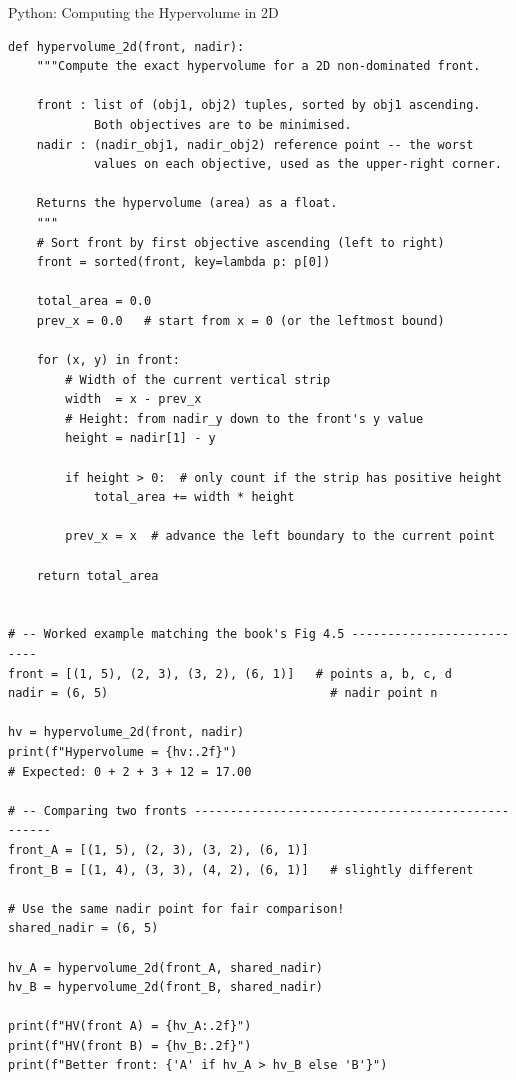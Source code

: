 \documentclass[aspectratio=169,10pt]{beamer}
\begin{document}
\begin{frame}[fragile]{Python: Computing the Hypervolume in 2D}
\begin{lstlisting}
def hypervolume_2d(front, nadir):
    """Compute the exact hypervolume for a 2D non-dominated front.

    front : list of (obj1, obj2) tuples, sorted by obj1 ascending.
            Both objectives are to be minimised.
    nadir : (nadir_obj1, nadir_obj2) reference point -- the worst
            values on each objective, used as the upper-right corner.

    Returns the hypervolume (area) as a float.
    """
    # Sort front by first objective ascending (left to right)
    front = sorted(front, key=lambda p: p[0])

    total_area = 0.0
    prev_x = 0.0   # start from x = 0 (or the leftmost bound)

    for (x, y) in front:
        # Width of the current vertical strip
        width  = x - prev_x
        # Height: from nadir_y down to the front's y value
        height = nadir[1] - y

        if height > 0:  # only count if the strip has positive height
            total_area += width * height

        prev_x = x  # advance the left boundary to the current point

    return total_area


# -- Worked example matching the book's Fig 4.5 --------------------------
front = [(1, 5), (2, 3), (3, 2), (6, 1)]   # points a, b, c, d
nadir = (6, 5)                               # nadir point n

hv = hypervolume_2d(front, nadir)
print(f"Hypervolume = {hv:.2f}")
# Expected: 0 + 2 + 3 + 12 = 17.00

# -- Comparing two fronts --------------------------------------------------
front_A = [(1, 5), (2, 3), (3, 2), (6, 1)]
front_B = [(1, 4), (3, 3), (4, 2), (6, 1)]   # slightly different

# Use the same nadir point for fair comparison!
shared_nadir = (6, 5)

hv_A = hypervolume_2d(front_A, shared_nadir)
hv_B = hypervolume_2d(front_B, shared_nadir)

print(f"HV(front A) = {hv_A:.2f}")
print(f"HV(front B) = {hv_B:.2f}")
print(f"Better front: {'A' if hv_A > hv_B else 'B'}")
\end{lstlisting}
\end{frame}
\end{document}

